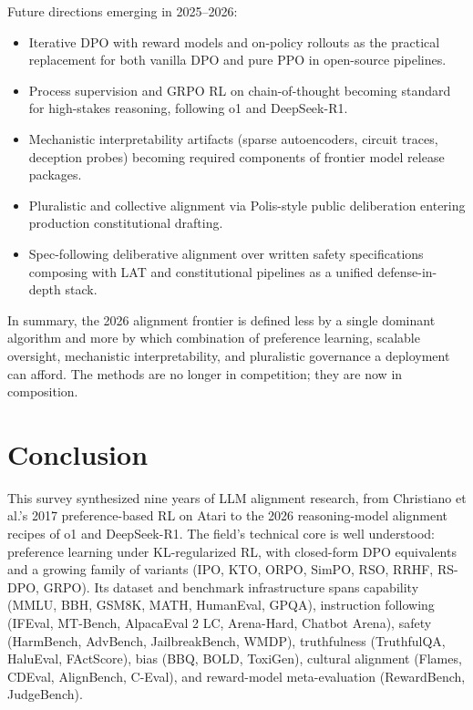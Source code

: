 \documentclass{article}
\begin{document}
Future directions emerging in 2025--2026:

\begin{itemize}

\item
  Iterative DPO with reward models and on-policy rollouts as the practical replacement for both vanilla DPO and pure PPO in open-source pipelines.
\item
  Process supervision and GRPO RL on chain-of-thought becoming standard for high-stakes reasoning, following o1 and DeepSeek-R1.
\item
  Mechanistic interpretability artifacts (sparse autoencoders, circuit traces, deception probes) becoming required components of frontier model release packages.
\item
  Pluralistic and collective alignment via Polis-style public deliberation entering production constitutional drafting.
\item
  Spec-following deliberative alignment over written safety specifications composing with LAT and constitutional pipelines as a unified defense-in-depth stack.
\end{itemize}

In summary, the 2026 alignment frontier is defined less by a single dominant algorithm and more by which combination of preference learning, scalable oversight, mechanistic interpretability, and pluralistic governance a deployment can afford. The methods are no longer in competition; they are now in composition.

\section{Conclusion}\label{conclusion}

This survey synthesized nine years of LLM alignment research, from Christiano et al.'s 2017 preference-based RL on Atari to the 2026 reasoning-model alignment recipes of o1 and DeepSeek-R1. The field's technical core is well understood: preference learning under KL-regularized RL, with closed-form DPO equivalents and a growing family of variants (IPO, KTO, ORPO, SimPO, RSO, RRHF, RS-DPO, GRPO). Its dataset and benchmark infrastructure spans capability (MMLU, BBH, GSM8K, MATH, HumanEval, GPQA), instruction following (IFEval, MT-Bench, AlpacaEval 2 LC, Arena-Hard, Chatbot Arena), safety (HarmBench, AdvBench, JailbreakBench, WMDP), truthfulness (TruthfulQA, HaluEval, FActScore), bias (BBQ, BOLD, ToxiGen), cultural alignment (Flames, CDEval, AlignBench, C-Eval), and reward-model meta-evaluation (RewardBench, JudgeBench).
\end{document}

